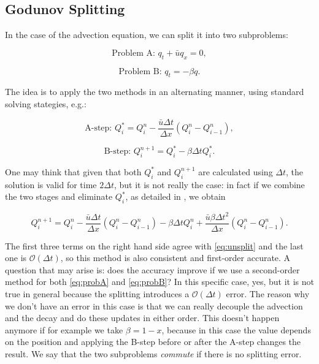 \documentclass[journal,onecolumn]{IEEEtran}
\begin{document}
\subsection{Godunov Splitting}

In the case of the advection equation, we can split it into two subproblems:

\begin{equation}\label{eq:probA}
	\text{Problem A: } q_t+\bar{u}q_x=0,
\end{equation}

\begin{equation}\label{eq:probB}
	\text{Problem B: } q_t = -\beta q.
\end{equation}

The idea is to apply the two methods in an alternating manner, using standard solving stategies, e.g.:

\begin{equation}\label{eq:stepA}
	\text{A-step: } Q_i^* = Q_i^n - \frac{\bar{u}\Delta t}{\Delta x} (Q_i^n-Q_{i-1}^n),
\end{equation}

\begin{equation}\label{eq:stepB}
	\text{B-step: } Q_i^{n+1} = Q_i^*-\beta\Delta tQ_i^*.
\end{equation}

One may think that given that both $Q_i^*$ and $Q_i^{n+1}$ are calculated using $\Delta t$, the solution is valid for time $2\Delta t$, but it is not really the case: in fact if we combine the two stages and eliminate $Q_i^*$, as detailed in \cite{leveque}, we obtain

\begin{equation}
	Q_i^{n+1} = Q_i^n -\frac{\bar{u}\Delta t}{\Delta x}(Q_i^n-Q_{i-1}^n)-\beta\Delta tQ_i^n +\frac{\bar{u}\beta\Delta t^2}{\Delta x}(Q_i^n-Q_{i-1}^n).
\end{equation}

The first three terms on the right hand side agree with \eqref{eq:unsplit} and the last one is $\mathcal{O}(\Delta t)$, so this method is also consistent and first-order accurate. A question that may arise is: does the accuracy improve if we use a second-order method for both \eqref{eq:probA} and \eqref{eq:probB}? In this specific case, yes, but it is not true in general because the splitting introduces a $\mathcal{O}(\Delta t)$ error. The reason why we don't have an error in this case is that we can really decouple the advection and the decay and do these updates in either order. This doesn't happen anymore if for example we take $\beta = 1-x$, because in this case the value depends on the position and applying the B-step before or after the A-step changes the result. We say that the two subproblems \textit{commute} if there is no splitting error.
\end{document}
